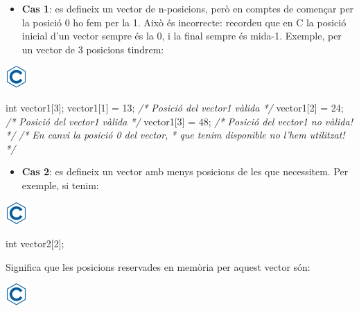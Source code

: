 \documentclass[]{book}
\newenvironment{Shaded}{\begin{snugshade}}{\end{snugshade}}
\newcommand{\DataTypeTok}[1]{\textcolor[rgb]{0.13,0.29,0.53}{#1}}
\newcommand{\DecValTok}[1]{\textcolor[rgb]{0.00,0.00,0.81}{#1}}
\newcommand{\CommentTok}[1]{\textcolor[rgb]{0.56,0.35,0.01}{\textit{#1}}}
\newcommand{\NormalTok}[1]{#1}
\providecommand{\tightlist}{%
  \setlength{\itemsep}{0pt}\setlength{\parskip}{0pt}}
\begin{document}
\begin{itemize}
\tightlist
\item
  \textbf{Cas 1}: es defineix un vector de n-posicions, però en comptes
  de començar per la posició 0 ho fem per la 1. Això és incorrecte:
  recordeu que en C la posició inicial d'un vector sempre és la 0, i la
  final sempre és mida-1. Exemple, per un vector de 3 posicions tindrem:
\end{itemize}

\includegraphics{./img/c.png}

\begin{Shaded}
\begin{Highlighting}[]
\DataTypeTok{int}\NormalTok{ vector1[}\DecValTok{3}\NormalTok{];}
\NormalTok{vector1[}\DecValTok{1}\NormalTok{] = }\DecValTok{13}\NormalTok{;  }\CommentTok{/* Posició del vector1 vàlida */}
\NormalTok{vector1[}\DecValTok{2}\NormalTok{] = }\DecValTok{24}\NormalTok{;  }\CommentTok{/* Posició del vector1 vàlida */}
\NormalTok{vector1[}\DecValTok{3}\NormalTok{] = }\DecValTok{48}\NormalTok{;  }\CommentTok{/* Posició del vector1 no vàlida! */}
\CommentTok{/* En canvi la posició 0 del vector, }
\CommentTok{ * que tenim disponible no l'hem utilitzat! }
\CommentTok{ */}
\end{Highlighting}
\end{Shaded}

\begin{itemize}
\tightlist
\item
  \textbf{Cas 2}: es defineix un vector amb menys posicions de les que
  necessitem. Per exemple, si tenim:
\end{itemize}

\includegraphics{./img/c.png}

\begin{Shaded}
\begin{Highlighting}[]
\DataTypeTok{int}\NormalTok{ vector2[}\DecValTok{2}\NormalTok{];}
\end{Highlighting}
\end{Shaded}

Significa que les posicions reservades en memòria per aquest vector són:

\includegraphics{./img/c.png}
\end{document}
